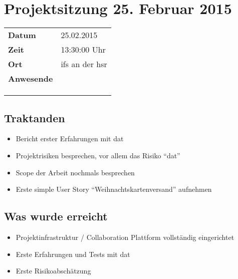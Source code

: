 \documentclass[class=scrbook,crop=false]{standalone}
\begin{document}
	
	\section{Projektsitzung 25. Februar 2015}
	
	\begin{tabular}{ll}
		\textbf{Datum} & 25.02.2015 \\
		\textbf{Zeit} & 13:30\textendash15:00 Uhr \\
		\textbf{Ort} & \acs{ifs} an der \acs{hsr} \\
		\textbf{Anwesende} & \proff \\ & \chuf \\ & \rlif \\ & \fscf
	\end{tabular}
	
	\subsection*{Traktanden}
	\begin{itemize}
		\item Bericht erster Erfahrungen mit \gls{dat}
		\item Projektrisiken besprechen, vor allem das Risiko ``\gls{dat}''
		\item Scope der Arbeit nochmals besprechen
		\item Erste simple User Story ``Weihnachtskartenversand'' aufnehmen
	\end{itemize}
	
	\subsection*{Was wurde erreicht}
	\begin{itemize}
		\item Projektinfrastruktur / Collaboration Plattform vollständig eingerichtet
		\item Erste Erfahrungen und Tests mit \gls{dat}
		\item Erste Risikoabschätzung
	\end{itemize}
	
\end{document}
